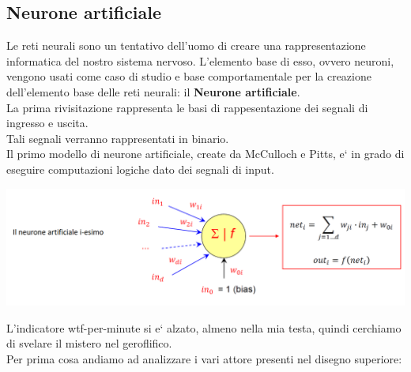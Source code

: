 \subsection{Neurone artificiale}
Le reti neurali sono un tentativo dell'uomo di creare una rappresentazione 
%
informatica del nostro sistema nervoso.
L'elemento base di esso, ovvero neuroni, vengono usati come caso di studio e base
%
comportamentale per la creazione dell'elemento base delle reti neurali: il 
\textbf{Neurone artificiale}.
\\
La prima rivisitazione rappresenta le basi di rappesentazione dei segnali di 
%
ingresso e uscita.
\\
Tali segnali verranno rappresentati in binario.
\\
Il primo modello di neurone artificiale, create da McCulloch e Pitts, e` in grado di eseguire
computazioni logiche dato dei segnali di input.
\begin{center}
    \includegraphics[scale=0.4]{images/Neurone_artificiale.png}
\end{center}
L'indicatore wtf-per-minute si e` alzato, almeno nella mia testa, quindi cerchiamo
%
di svelare il mistero nel geroflifico.
\\
Per prima cosa andiamo ad analizzare i vari attore presenti nel disegno superiore:
